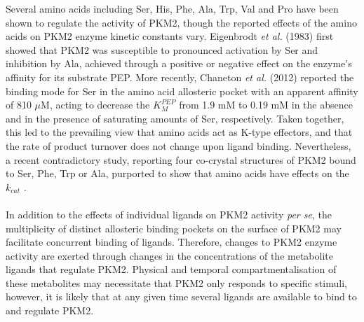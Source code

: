 Several amino acids including Ser, His, Phe, Ala, Trp, Val and Pro have been shown to regulate the activity of PKM2, though the reported effects of the amino acids on PKM2 enzyme kinetic constants vary. Eigenbrodt \textit{et al.} (1983) \cite{Eigenbrodt:1983aa} first showed that PKM2 was susceptible to pronounced activation by Ser and inhibition by Ala, achieved through a positive or negative effect on the enzyme's affinity for its substrate PEP. More recently, Chaneton \textit{et al.} (2012) \cite{Chaneton:2012aa} reported the binding mode for Ser in the amino acid allosteric pocket with an apparent affinity of 810 $\mu$M, acting to decrease the $K_{M}^{PEP}$ from 1.9 mM to 0.19 mM in the absence and in the presence of saturating amounts of Ser, respectively. Taken together, this led to the prevailing view that amino acids act as K-type effectors, and that the rate of product turnover does not change upon ligand binding. Nevertheless, a recent contradictory study, reporting four co-crystal structures of PKM2 bound to Ser, Phe, Trp or Ala, purported to show that amino acids have effects on the $k_{cat}$ \cite{Yuan:2018aa}. 
%
%
\\\\
%
%
In addition to the effects of individual ligands on PKM2 activity \textit{per se}, the multiplicity of distinct allosteric binding pockets on the surface of PKM2 may facilitate concurrent binding of ligands. Therefore, changes to PKM2 enzyme activity are exerted through changes in the concentrations of the metabolite ligands that regulate PKM2. Physical and temporal compartmentalisation of these metabolites may necessitate that PKM2 only responds to specific stimuli, however, it is likely that at any given time several ligands are available to bind to and regulate PKM2.  

